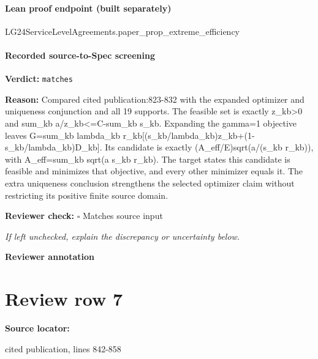 \documentclass[10pt]{article}
\newcommand{\reviewerbox}{%
  \par\noindent\fbox{\parbox{0.96\linewidth}{\rule{0pt}{0.38in}}}\par
}
\newcommand{\reviewmatch}[1]{%
  \par\noindent\textbf{Reviewer check:} $\square$\; #1\par
  \noindent\emph{If left unchecked, explain the discrepancy or uncertainty below.}\par
}
\begin{document}
\paragraph{Lean proof endpoint (built separately)}\begin{ReviewVerbatim}
LG24ServiceLevelAgreements.paper_prop_extreme_efficiency
\end{ReviewVerbatim}

\paragraph{Recorded source-to-Spec screening}
\textbf{Verdict:} \texttt{matches}
\\
{\raggedright
\textbf{Reason:} Compared cited publication:\allowbreak{}823-\allowbreak{}832 with the expanded optimizer and uniqueness conjunction and all 19 supports.\allowbreak{} The feasible set is exactly z\_\allowbreak{}kb>0 and sum\_\allowbreak{}kb a/\allowbreak{}z\_\allowbreak{}kb<=C-\allowbreak{}sum\_\allowbreak{}kb s\_\allowbreak{}kb.\allowbreak{} Expanding the gamma=1 objective leaves G=sum\_\allowbreak{}kb lambda\_\allowbreak{}kb r\_\allowbreak{}kb[(s\_\allowbreak{}kb/\allowbreak{}lambda\_\allowbreak{}kb)z\_\allowbreak{}kb+(1-\allowbreak{}s\_\allowbreak{}kb/\allowbreak{}lambda\_\allowbreak{}kb)D\_\allowbreak{}kb].\allowbreak{} Its candidate is exactly (A\_\allowbreak{}eff/\allowbreak{}E)sqrt(a/\allowbreak{}(s\_\allowbreak{}kb r\_\allowbreak{}kb)), with A\_\allowbreak{}eff=sum\_\allowbreak{}kb sqrt(a s\_\allowbreak{}kb r\_\allowbreak{}kb).\allowbreak{} The target states this candidate is feasible and minimizes that objective, and every other minimizer equals it.\allowbreak{} The extra uniqueness conclusion strengthens the selected optimizer claim without restricting its positive finite source domain.\allowbreak{}
\par}
\reviewmatch{Matches source input}
\noindent\textbf{Reviewer annotation}\par
\reviewerbox
\clearpage
\hypertarget{source-claim-61e126b704e64008}{}
\section*{Review row 7}
\textbf{Source locator:} {\footnotesize\raggedright cited publication, lines 842-\allowbreak{}858\par}
\end{document}
